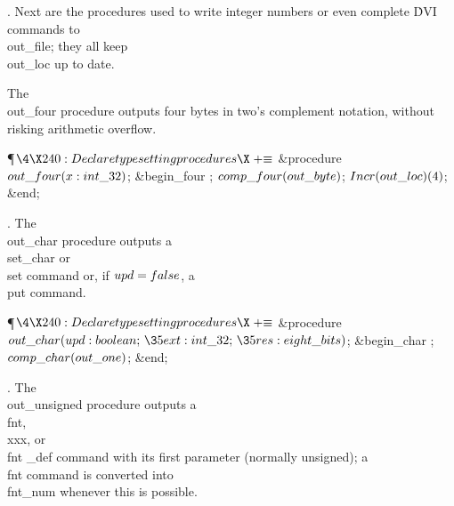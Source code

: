 . Next are the procedures used to write integer numbers or even complete
\.{DVI} commands to \\{out\_file}; they all keep \\{out\_loc} up to date.

The \\{out\_four} procedure outputs four bytes in two's complement notation,
without risking arithmetic overflow.

\Y\P$\4\X240:Declare typesetting procedures\X\mathrel{+}\S$\6
\4\&{procedure}\1\  $\\{out\_four}(\|x:\\{int\_32})$;\2%
\6
\&{begin\_four} ;\5
$\\{comp\_four}(\\{out\_byte})$;\5
$\\{Incr}(\\{out\_loc})(4)$;\6
\&{end};\par
\fi

. The \\{out\_char} procedure outputs a \\{set\_char} or \\{set} command
or, if
$\\{upd}=\\{false}$, a \\{put} command.

\Y\P$\4\X240:Declare typesetting procedures\X\mathrel{+}\S$\6
\4\&{procedure}\1\  $\\{out\_char}(\\{upd}:\\{boolean};\,\35\\{ext}:\\{int%
\_32};\,\35\\{res}:\\{eight\_bits})$;\2\6
\&{begin\_char} ;\5
$\\{comp\_char}(\\{out\_one})$;\6
\&{end};\par
\fi

. The \\{out\_unsigned} procedure outputs a \\{fnt}, \\{xxx}, or \\{fnt%
\_def}
command with its first parameter (normally unsigned); a \\{fnt} command
is converted into \\{fnt\_num} whenever this is possible.

